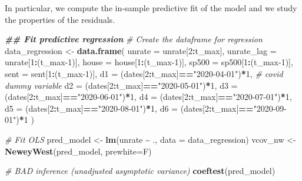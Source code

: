 \documentclass[
]{book}
\newenvironment{Shaded}{\begin{snugshade}}{\end{snugshade}}
\newcommand{\AttributeTok}[1]{\textcolor[rgb]{0.13,0.29,0.53}{#1}}
\newcommand{\CommentTok}[1]{\textcolor[rgb]{0.56,0.35,0.01}{\textit{#1}}}
\newcommand{\DecValTok}[1]{\textcolor[rgb]{0.00,0.00,0.81}{#1}}
\newcommand{\DocumentationTok}[1]{\textcolor[rgb]{0.56,0.35,0.01}{\textbf{\textit{#1}}}}
\newcommand{\FunctionTok}[1]{\textcolor[rgb]{0.13,0.29,0.53}{\textbf{#1}}}
\newcommand{\NormalTok}[1]{#1}
\newcommand{\OtherTok}[1]{\textcolor[rgb]{0.56,0.35,0.01}{#1}}
\newcommand{\SpecialCharTok}[1]{\textcolor[rgb]{0.81,0.36,0.00}{\textbf{#1}}}
\newcommand{\StringTok}[1]{\textcolor[rgb]{0.31,0.60,0.02}{#1}}
\begin{document}
In particular, we compute the in-sample predictive fit of the model and we study the properties of the residuals.

\begin{Shaded}
\begin{Highlighting}[]
\DocumentationTok{\#\# Fit predictive regression}
\CommentTok{\# Create the dataframe for regression }
\NormalTok{data\_regression }\OtherTok{\textless{}{-}} \FunctionTok{data.frame}\NormalTok{(}
  \AttributeTok{unrate     =}\NormalTok{ unrate[}\DecValTok{2}\SpecialCharTok{:}\NormalTok{t\_max],}
  \AttributeTok{unrate\_lag =}\NormalTok{ unrate[}\DecValTok{1}\SpecialCharTok{:}\NormalTok{(t\_max}\DecValTok{{-}1}\NormalTok{)],}
  \AttributeTok{house      =}\NormalTok{ house[}\DecValTok{1}\SpecialCharTok{:}\NormalTok{(t\_max}\DecValTok{{-}1}\NormalTok{)],}
  \AttributeTok{sp500      =}\NormalTok{ sp500[}\DecValTok{1}\SpecialCharTok{:}\NormalTok{(t\_max}\DecValTok{{-}1}\NormalTok{)],}
  \AttributeTok{sent       =}\NormalTok{ sent[}\DecValTok{1}\SpecialCharTok{:}\NormalTok{(t\_max}\DecValTok{{-}1}\NormalTok{)],}
  \AttributeTok{d1 =}\NormalTok{ (dates[}\DecValTok{2}\SpecialCharTok{:}\NormalTok{t\_max]}\SpecialCharTok{==}\StringTok{"2020{-}04{-}01"}\NormalTok{)}\SpecialCharTok{*}\DecValTok{1}\NormalTok{, }\CommentTok{\# covid dummy variable}
  \AttributeTok{d2 =}\NormalTok{ (dates[}\DecValTok{2}\SpecialCharTok{:}\NormalTok{t\_max]}\SpecialCharTok{==}\StringTok{"2020{-}05{-}01"}\NormalTok{)}\SpecialCharTok{*}\DecValTok{1}\NormalTok{, }
  \AttributeTok{d3 =}\NormalTok{ (dates[}\DecValTok{2}\SpecialCharTok{:}\NormalTok{t\_max]}\SpecialCharTok{==}\StringTok{"2020{-}06{-}01"}\NormalTok{)}\SpecialCharTok{*}\DecValTok{1}\NormalTok{, }
  \AttributeTok{d4 =}\NormalTok{ (dates[}\DecValTok{2}\SpecialCharTok{:}\NormalTok{t\_max]}\SpecialCharTok{==}\StringTok{"2020{-}07{-}01"}\NormalTok{)}\SpecialCharTok{*}\DecValTok{1}\NormalTok{, }
  \AttributeTok{d5 =}\NormalTok{ (dates[}\DecValTok{2}\SpecialCharTok{:}\NormalTok{t\_max]}\SpecialCharTok{==}\StringTok{"2020{-}08{-}01"}\NormalTok{)}\SpecialCharTok{*}\DecValTok{1}\NormalTok{, }
  \AttributeTok{d6 =}\NormalTok{ (dates[}\DecValTok{2}\SpecialCharTok{:}\NormalTok{t\_max]}\SpecialCharTok{==}\StringTok{"2020{-}09{-}01"}\NormalTok{)}\SpecialCharTok{*}\DecValTok{1} 
\NormalTok{)}

\CommentTok{\# Fit OLS}
\NormalTok{pred\_model }\OtherTok{\textless{}{-}} \FunctionTok{lm}\NormalTok{(unrate }\SpecialCharTok{\textasciitilde{}}\NormalTok{ ., }\AttributeTok{data =}\NormalTok{ data\_regression)}
\NormalTok{vcov\_nw }\OtherTok{\textless{}{-}} \FunctionTok{NeweyWest}\NormalTok{(pred\_model, }\AttributeTok{prewhite=}\NormalTok{F)}

\CommentTok{\# BAD inference (unadjusted asymptotic variance)}
\FunctionTok{coeftest}\NormalTok{(pred\_model)}
\end{Highlighting}
\end{Shaded}
\end{document}
